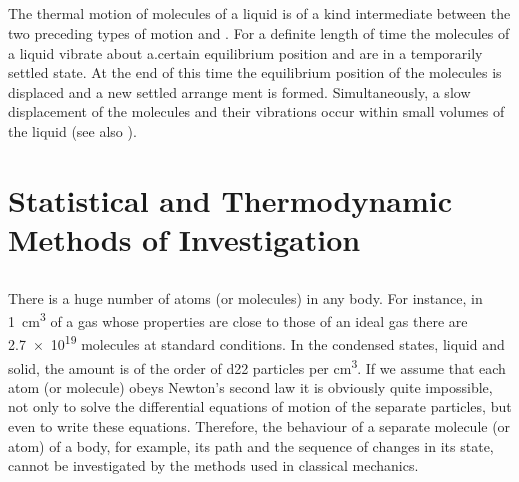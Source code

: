 \subsection{}\label{8.1.5} The thermal motion of molecules of a liquid is of a kind intermediate between the two preceding types of motion  and . For a definite length of time the molecules of a liquid vibrate about a.certain equilibrium position and are in a tem­porarily settled state. At the end of this time the equilibrium position of the molecules is displaced and a new settled arrange­ ment is formed. Simultaneously, a slow displacement of the molecules and their vibrations occur within small volumes of the liquid (see also ).

\section[Statistical and Thermodynamic Methods]{Statistical and Thermodynamic\\ Methods of Investigation}
\label{sec-8.2} 

\subsection{}\label{8.2.1} There is a huge number of atoms (or molecules) in any body. For instance, in \SI{1}{\centi\meter\cubed} of a gas whose properties are close to those of an ideal gas there are \num{2.7e19} molecules at stand­ard conditions. In the condensed states, liquid and solid, the amount is of the order of \num{d22} particles per \si{\centi\meter\cubed}. If we assume that each atom (or molecule) obeys Newton's second law  it is obviously quite impossible, not only to solve the dif­ferential equations of motion of the separate particles, but even to write these equations. Therefore, the behaviour of a separate molecule (or atom) of a body, for example, its path and the sequence of changes in its state, cannot be investigated by the methods used in classical mechanics.

